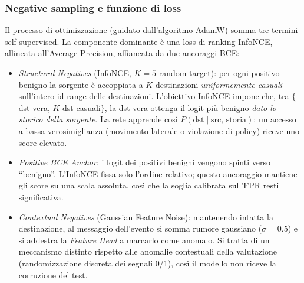\documentclass[11pt,a4paper]{report}
\begin{document}
\subsubsection{Negative sampling e funzione di loss}

Il processo di ottimizzazione (guidato dall'algoritmo AdamW) somma tre termini self-supervised. La componente dominante è una loss di ranking InfoNCE, allineata all'Average Precision, affiancata da due ancoraggi BCE:

\begin{itemize}
    \item \textit{Structural Negatives} (InfoNCE, $K{=}5$ random target): per ogni positivo benigno la sorgente è accoppiata a $K$ destinazioni \emph{uniformemente casuali} sull'intero id-range delle destinazioni. L'obiettivo InfoNCE impone che, tra $\{$dst-vera, $K$ dst-casuali$\}$, la dst-vera ottenga il logit più benigno \emph{dato lo storico della sorgente}. La rete apprende così $P(\text{dst}\mid\text{src, storia})$: un accesso a bassa verosimiglianza (movimento laterale o violazione di policy) riceve uno score elevato.
    \item \textit{Positive BCE Anchor}: i logit dei positivi benigni vengono spinti verso ``benigno''. L'InfoNCE fissa solo l'ordine relativo; questo ancoraggio mantiene gli score su una scala assoluta, così che la soglia calibrata sull'FPR resti significativa.
    \item \textit{Contextual Negatives} (Gaussian Feature Noise): mantenendo intatta la destinazione, al messaggio dell'evento si somma rumore gaussiano ($\sigma{=}0.5$) e si addestra la \textit{Feature Head} a marcarlo come anomalo. Si tratta di un meccanismo distinto rispetto alle anomalie contestuali della valutazione (randomizzazione discreta dei segnali 0/1), così il modello non riceve la corruzione del test.
\end{itemize}

\end{document}
